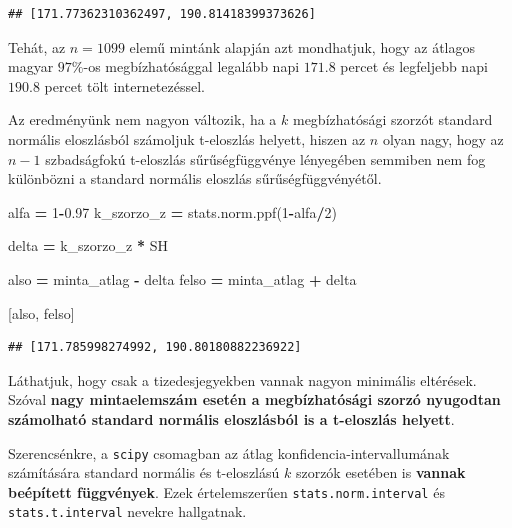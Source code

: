 \documentclass[
]{book}
\newenvironment{Shaded}{\begin{snugshade}}{\end{snugshade}}
\newcommand{\DecValTok}[1]{\textcolor[rgb]{0.00,0.00,0.81}{#1}}
\newcommand{\FloatTok}[1]{\textcolor[rgb]{0.00,0.00,0.81}{#1}}
\newcommand{\NormalTok}[1]{#1}
\newcommand{\OperatorTok}[1]{\textcolor[rgb]{0.81,0.36,0.00}{\textbf{#1}}}
\begin{document}
\begin{verbatim}
## [171.77362310362497, 190.81418399373626]
\end{verbatim}

Tehát, az \(n=1099\) elemű mintánk alapján azt mondhatjuk, hogy az átlagos magyar \(97\%\)-os megbízhatósággal legalább napi \(171.8\) percet és legfeljebb napi \(190.8\) percet tölt internetezéssel.

Az eredményünk nem nagyon változik, ha a \(k\) megbízhatósági szorzót standard normális eloszlásból számoljuk t-eloszlás helyett, hiszen az \(n\) olyan nagy, hogy az \(n-1\) szbadságfokú t-eloszlás sűrűségfüggvénye lényegében semmiben nem fog különbözni a standard normális eloszlás sűrűségfüggvényétől.

\begin{Shaded}
\begin{Highlighting}[]
\NormalTok{alfa }\OperatorTok{=} \DecValTok{1}\OperatorTok{{-}}\FloatTok{0.97}
\NormalTok{k\_szorzo\_z }\OperatorTok{=}\NormalTok{ stats.norm.ppf(}\DecValTok{1}\OperatorTok{{-}}\NormalTok{alfa}\OperatorTok{/}\DecValTok{2}\NormalTok{)}

\NormalTok{delta }\OperatorTok{=}\NormalTok{ k\_szorzo\_z }\OperatorTok{*}\NormalTok{ SH}

\NormalTok{also }\OperatorTok{=}\NormalTok{ minta\_atlag }\OperatorTok{{-}}\NormalTok{ delta}
\NormalTok{felso }\OperatorTok{=}\NormalTok{ minta\_atlag }\OperatorTok{+}\NormalTok{ delta}

\NormalTok{[also, felso]}
\end{Highlighting}
\end{Shaded}

\begin{verbatim}
## [171.785998274992, 190.80180882236922]
\end{verbatim}

Láthatjuk, hogy csak a tizedesjegyekben vannak nagyon minimális eltérések. Szóval \textbf{nagy mintaelemszám esetén a megbízhatósági szorzó nyugodtan számolható standard normális eloszlásból is a t-eloszlás helyett}.

Szerencsénkre, a \texttt{scipy} csomagban az átlag konfidencia-intervallumának számítására standard normális és t-eloszlású \(k\) szorzók esetében is \textbf{vannak beépített függvények}.
Ezek értelemszerűen \texttt{stats.norm.interval} és \texttt{stats.t.interval} nevekre hallgatnak.
\end{document}
